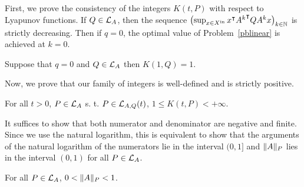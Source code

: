 \documentclass[10pt]{llncs}
\begin{document}
First, we prove the consistency of the integers $K(t,P)$ with respect to Lyapunov functions. If $Q\in\mathcal{L}_{A}$, then the sequence $\left(\sup_{x\in X^\mathrm{in}} x^\intercal {A^k}^\intercal Q A^k x\right)_{k\in\mathbb{N}}$ is strictly decreasing. Then if $q=0$, the optimal value of Problem~\eqref{pblinear} is achieved at $k=0$. 
\begin{prop}
\label{lyapunovbigk}
Suppose that $q=0$ and $Q\in\mathcal{L}_{A}$ then $K(1,Q)=1$.  
\end{prop}


Now, we prove that our family of integers is well-defined and is strictly positive.

\begin{prop}
For all $t>0$, $P\in \mathcal{L}_{A}$ s. t. $P\in \mathcal{L}_{A,Q}(t)$, $1\leq K(t,P)< +\infty$.  
\end{prop}

It suffices to show that both numerator and denominator are negative and finite. Since we use the natural logarithm, this is equivalent to show that the arguments of the natural logarithm of the numerators lie in the interval $(0,1]$ and $\| A\|_P$ lies in the interval $(0,1)$ for all $P\in\mathcal{L}_{A}$. 

\begin{lemma}
\label{lyapnorm}
For all $P\in\mathcal{L}_{A}$, $0<\| A\|_P<1$. 
\end{lemma}
\end{document}
